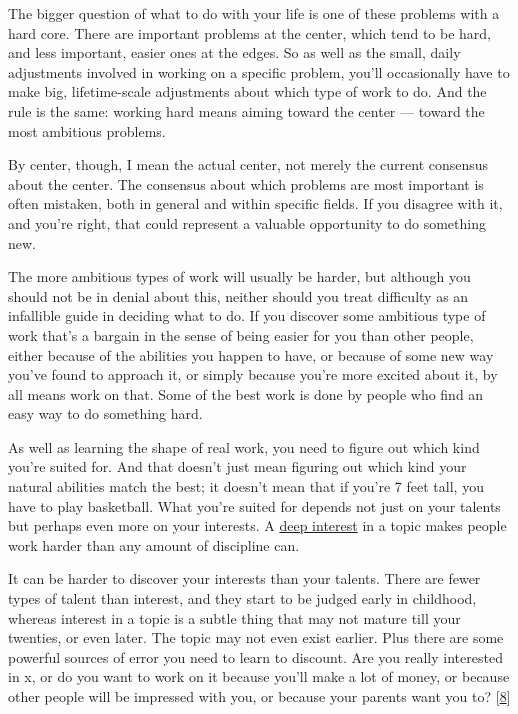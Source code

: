 The bigger question of what to do with your life is one of these
problems with a hard core. There are important problems at the center,
which tend to be hard, and less important, easier ones at the edges. So
as well as the small, daily adjustments involved in working on a
specific problem, you'll occasionally have to make big, lifetime-scale
adjustments about which type of work to do. And the rule is the same:
working hard means aiming toward the center --- toward the most
ambitious problems.

By center, though, I mean the actual center, not merely the current
consensus about the center. The consensus about which problems are most
important is often mistaken, both in general and within specific fields.
If you disagree with it, and you're right, that could represent a
valuable opportunity to do something new.

The more ambitious types of work will usually be harder, but although
you should not be in denial about this, neither should you treat
difficulty as an infallible guide in deciding what to do. If you
discover some ambitious type of work that's a bargain in the sense of
being easier for you than other people, either because of the abilities
you happen to have, or because of some new way you've found to approach
it, or simply because you're more excited about it, by all means work on
that. Some of the best work is done by people who find an easy way to do
something hard.

As well as learning the shape of real work, you need to figure out which
kind you're suited for. And that doesn't just mean figuring out which
kind your natural abilities match the best; it doesn't mean that if
you're 7 feet tall, you have to play basketball. What you're suited for
depends not just on your talents but perhaps even more on your
interests. A \href{genius.html}{deep interest} in a topic makes people
work harder than any amount of discipline can.

It can be harder to discover your interests than your talents. There are
fewer types of talent than interest, and they start to be judged early
in childhood, whereas interest in a topic is a subtle thing that may not
mature till your twenties, or even later. The topic may not even exist
earlier. Plus there are some powerful sources of error you need to learn
to discount. Are you really interested in x, or do you want to work on
it because you'll make a lot of money, or because other people will be
impressed with you, or because your parents want you to?
{[}\hyperref[f8n]{8}{]}


